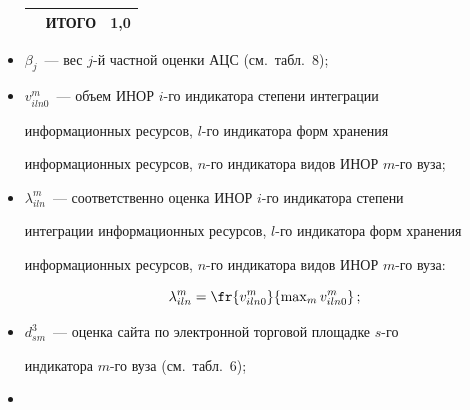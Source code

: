 \begin{itemize}
\begin{table}
\begin{center}
\begin{tabular}{|c|l|c|}
&ИТОГО&1,0\hphantom{9}\\


\hline


\end{tabular}


\end{center}


\vspace*{-12pt}


\end{table}








  \item


$\beta_j$~--- вес $j$-й частной оценки АЦС (см.\ табл.~8); 


  \item


$v^m_{i ln 0}$~--- объем ИНОР $i$-го индикатора степени интеграции 


информационных ресурсов, $l$-го индикатора форм хранения 


информационных ресурсов, $n$-го индикатора видов ИНОР $m$-го вуза;


  \item


$\lambda^m_{i ln}$~--- соответственно оценка ИНОР $i$-го индикатора степени 


интеграции информационных ресурсов, $l$-го индикатора форм хранения 


информационных ресурсов, $n$-го индикатора видов ИНОР $m$-го вуза:





\noindent


$$


\lambda^m_{iln}= \fr{v^m_{iln 0}}{\max\nolimits_m v^m_{iln 0}}\,;


$$





\vspace*{-6pt}





  \item


$d^3_{sm}$~--- оценка сайта по электронной торговой площадке $s$-го 


индикатора $m$-го вуза (см.\ табл.~6); 


  \item



\end{itemize}
